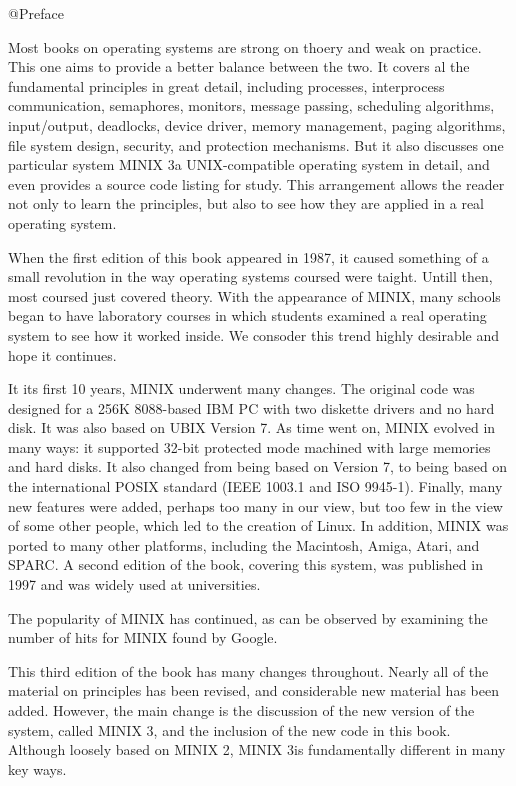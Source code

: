 \documentclass{book}
\begin{document}
@Preface

Most books on operating systems are strong on thoery and weak on practice. 
This one aims to provide a better balance between the two.
It covers al the fundamental principles in great detail, 
including processes, interprocess communication, semaphores, monitors, message passing, 
scheduling algorithms, input/output, deadlocks, device driver, memory management, paging algorithms,
file system design, security, and protection mechanisms.
But it also discusses one particular system MINIX 3a UNIX-compatible operating system in detail, 
and even provides a source code listing for study.
This arrangement allows the reader not only to learn the principles, but also to see how they are applied in a real operating system.

When the first edition of this book appeared in 1987, it caused something of a small revolution in the way operating systems coursed were taight.
Untill then, most coursed just covered theory.
With the appearance of MINIX, many schools began to have laboratory courses in which students examined a real operating system to see how it worked inside.
We consoder this trend highly desirable and hope it continues.

It its first 10 years, MINIX underwent many changes.
The original code was designed for a 256K 8088-based IBM PC with two diskette drivers and no hard disk.
It was also based on UBIX Version 7. 
As time went on, MINIX evolved in many ways: it supported 32-bit protected mode machined with large memories and hard disks.
It also changed from being based on Version 7, to being based on the international POSIX standard (IEEE 1003.1 and ISO 9945-1).
Finally, many new features were added, perhaps too many in our view, but too few in the view of some other people, which led to the creation of Linux.
In addition, MINIX was ported to many other platforms, including the Macintosh, Amiga, Atari, and SPARC.
A second edition of the book, covering this system, was published in 1997 and was widely used at universities.

The popularity of MINIX has continued, as can be observed by examining the number of hits for MINIX found by Google.
 
This third edition of the book has many changes throughout.
Nearly all of the material on principles has been revised, and considerable new material has been added.
However, the main change is the discussion of the new version of the system, called MINIX 3, and the inclusion of the new code in this book.
Although loosely based on MINIX 2, MINIX 3is fundamentally different in many key ways.
\end{document}
